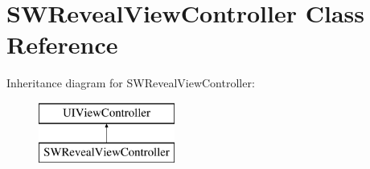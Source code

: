 \hypertarget{interface_s_w_reveal_view_controller}{}\section{S\+W\+Reveal\+View\+Controller Class Reference}
\label{interface_s_w_reveal_view_controller}
Inheritance diagram for S\+W\+Reveal\+View\+Controller\+:\begin{figure}[H]
\begin{center}
\leavevmode
\includegraphics[height=2.000000cm]{interface_s_w_reveal_view_controller}
\end{center}
\end{figure}
